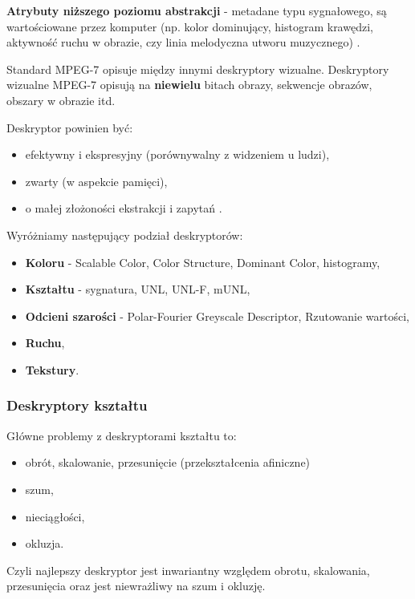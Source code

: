 \documentclass[wi]{zut}
\begin{document}
\textbf{Atrybuty niższego poziomu abstrakcji} - metadane typu sygnałowego, są wartościowane przez komputer (np. kolor dominujący, histogram krawędzi, aktywność ruchu w obrazie, czy linia melodyczna utworu muzycznego) \cite{Frejlichowski2020}.

Standard MPEG-7 opisuje między innymi deskryptory wizualne. Deskryptory wizualne MPEG-7 opisują na \textbf{niewielu} bitach obrazy, sekwencje obrazów, obszary w obrazie itd. 

Deskryptor powinien być:

\begin{itemize}
    \item efektywny i ekspresyjny (porównywalny z widzeniem u ludzi),
    \item zwarty (w aspekcie pamięci),
    \item o małej złożoności ekstrakcji i zapytań \cite{Frejlichowski2020}.
\end{itemize}

Wyróżniamy następujący podział deskryptorów:

\begin{itemize}
    \item \textbf{Koloru} - Scalable Color, Color Structure, Dominant Color, histogramy,
    \item \textbf{Kształtu} - sygnatura, UNL, UNL-F, mUNL,
    \item \textbf{Odcieni szarości} - Polar-Fourier Greyscale Descriptor, Rzutowanie wartości,
    \item \textbf{Ruchu},
    \item \textbf{Tekstury}.
\end{itemize}

\subsubsection{Deskryptory kształtu}

Główne problemy z deskryptorami kształtu to:

\begin{itemize}
    \item obrót, skalowanie, przesunięcie (przekształcenia afiniczne)
    \item szum,
    \item nieciągłości,
    \item okluzja.
\end{itemize}

Czyli najlepszy deskryptor jest inwariantny względem obrotu, skalowania, przesunięcia oraz jest niewrażliwy na szum i okluzję.
\end{document}
